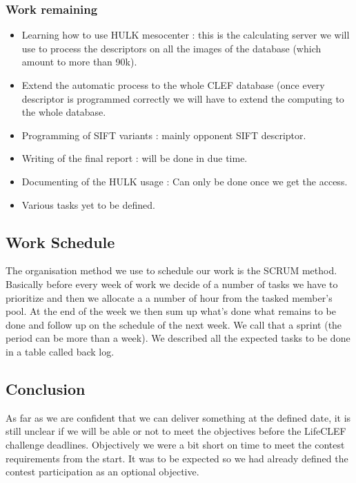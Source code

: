 \documentclass[12pt]{article}
\begin{document}
\subsubsection*{Work remaining}
\begin{itemize}
  \item Learning how to use HULK mesocenter : this is the calculating server we will use to process the descriptors on all the images of the database (which amount to more than 90k).
  \item Extend the automatic process to the whole CLEF database (once every descriptor is programmed correctly we will have to extend the computing to the whole database.
  \item Programming of SIFT variants : mainly opponent SIFT descriptor.
  \item Writing of the final report : will be done in due time.
  \item Documenting of the HULK usage : Can only be done once we get the access.
  \item Various tasks yet to be defined.
\end{itemize}

\subsection*{Work Schedule}
The organisation method we use to schedule our work is the SCRUM method. Basically before every week of work we decide of a number of tasks we have to prioritize and then we allocate a a number of hour from the tasked member's pool. At the end of the week we then sum up what's done what remains to be done and follow up on the schedule of the next week. We call that a sprint (the period can be more than a week).
We described all the expected tasks to be done in a table called back log.


\subsection*{Conclusion}
As far as we are confident that we can deliver something at the defined date, it is still unclear if we will be able or not to meet the objectives before the LifeCLEF challenge deadlines. Objectively we were a bit short on time to meet the contest requirements from the start. It was to be expected so we had already defined the contest participation  as an optional objective.
\end{document}
